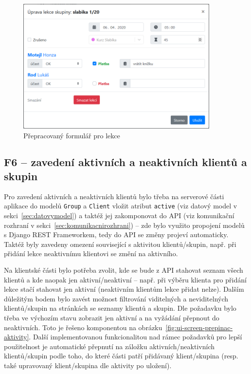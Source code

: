 \begin{figure}[h]\centering
    \includegraphics[width=0.9\textwidth]{img/ui-screen-formular-lekce.png}
    \caption{Přepracovaný formulář pro lekce}\label{fig:ui-screen-formular-lekce}
\end{figure}

\subsection{F6 -- zavedení aktivních a neaktivních klientů a skupin}

Pro zavedení aktivních a neaktivních klientů bylo třeba na serverové části aplikace do modelů \verb|Group| a \verb|Client| vložit atribut \verb|active| (viz datový model v sekci~\ref{sec:datovymodel}) a taktéž jej zakomponovat do API (viz komunikační rozhraní v sekci~\ref{sec:komunikacnirozhrani}) -- zde bylo využito propojení modelů s Django REST Frameworkem, tedy do API se změny projeví automaticky. Taktéž byly zavedeny omezení související s aktivitou klientů/skupin, např. při přidání lekce neaktivnímu klientovi se změní na aktivního.

Na klientské části bylo potřeba zvolit, kde se bude z API stahovat seznam všech klientů a kde naopak jen aktivní/neaktivní -- např. při výběru klienta pro přidání lekce stačí stahovat jen aktivní (neaktivním klientům lekce přidat nelze). Dalším důležitým bodem bylo zavést možnost filtrování viditelných a neviditelných klientů/skupin na stránkách se seznamy klientů a skupin. Dle požadavku bylo třeba ve výchozím stavu zobrazit jen aktivní a na vyžádání přepnout do neaktivních. Toto je řešeno komponentou na obrázku~\ref{fig:ui-screen-prepinac-aktivity}. Další implementovanou funkcionalitou nad rámec požadavků pro lepší použitelnost je automatické přepnutí na záložku aktivních/neaktivních klientů/skupin podle toho, do které části patří přidávaný klient/skupina (resp. také upravovaný klient/skupina dle aktivity po uložení).

